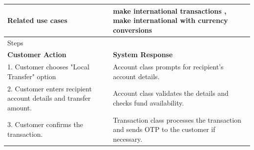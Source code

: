 \documentclass[a4paper]{report}
\begin{document}
\begin{table}[htbp]
\begin{tabularx}{\textwidth}{|X|X|}
    Related use cases                                                 & make international transactions , make international with currency conversions                                                                                                                                                                                                                                                            \\ \hline
    Steps                                                             &                                                                                                                                                                                                                                                                                                                                           \\ \hline
    \textbf{Customer Action}                                          & \textbf{System Response}                                                                                                                                                                                                                                                                                                                  \\ \hline
    1. Customer chooses "Local Transfer" option                       & Account class prompts for recipient's account details.                                                                                                                                                                                                                                                                                    \\ \hline
    2. Customer enters recipient account details and transfer amount. & Account class validates the details and checks fund availability.                                                                                                                                                                                                                                                                         \\ \hline
    3. Customer confirms the transaction.                             & Transaction class processes the transaction and sends OTP to the customer if necessary.                                                                                                                                                                                                                                                   \\ \hline

\end{tabularx}
\end{table}
\end{document}
